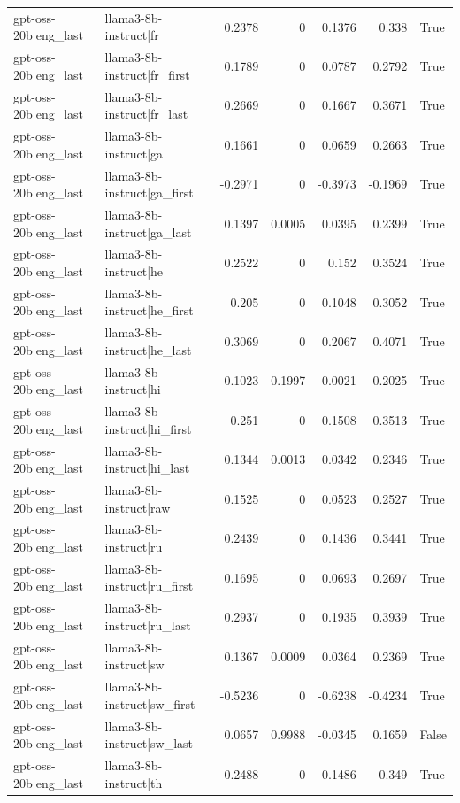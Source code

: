 \begin{table}
\begin{tabular}{l l r r r r l}
gpt-oss-20b|eng_last & llama3-8b-instruct|fr & 0.2378 & 0 & 0.1376 & 0.338 & True \\
gpt-oss-20b|eng_last & llama3-8b-instruct|fr_first & 0.1789 & 0 & 0.0787 & 0.2792 & True \\
gpt-oss-20b|eng_last & llama3-8b-instruct|fr_last & 0.2669 & 0 & 0.1667 & 0.3671 & True \\
gpt-oss-20b|eng_last & llama3-8b-instruct|ga & 0.1661 & 0 & 0.0659 & 0.2663 & True \\
gpt-oss-20b|eng_last & llama3-8b-instruct|ga_first & -0.2971 & 0 & -0.3973 & -0.1969 & True \\
gpt-oss-20b|eng_last & llama3-8b-instruct|ga_last & 0.1397 & 0.0005 & 0.0395 & 0.2399 & True \\
gpt-oss-20b|eng_last & llama3-8b-instruct|he & 0.2522 & 0 & 0.152 & 0.3524 & True \\
gpt-oss-20b|eng_last & llama3-8b-instruct|he_first & 0.205 & 0 & 0.1048 & 0.3052 & True \\
gpt-oss-20b|eng_last & llama3-8b-instruct|he_last & 0.3069 & 0 & 0.2067 & 0.4071 & True \\
gpt-oss-20b|eng_last & llama3-8b-instruct|hi & 0.1023 & 0.1997 & 0.0021 & 0.2025 & True \\
gpt-oss-20b|eng_last & llama3-8b-instruct|hi_first & 0.251 & 0 & 0.1508 & 0.3513 & True \\
gpt-oss-20b|eng_last & llama3-8b-instruct|hi_last & 0.1344 & 0.0013 & 0.0342 & 0.2346 & True \\
gpt-oss-20b|eng_last & llama3-8b-instruct|raw & 0.1525 & 0 & 0.0523 & 0.2527 & True \\
gpt-oss-20b|eng_last & llama3-8b-instruct|ru & 0.2439 & 0 & 0.1436 & 0.3441 & True \\
gpt-oss-20b|eng_last & llama3-8b-instruct|ru_first & 0.1695 & 0 & 0.0693 & 0.2697 & True \\
gpt-oss-20b|eng_last & llama3-8b-instruct|ru_last & 0.2937 & 0 & 0.1935 & 0.3939 & True \\
gpt-oss-20b|eng_last & llama3-8b-instruct|sw & 0.1367 & 0.0009 & 0.0364 & 0.2369 & True \\
gpt-oss-20b|eng_last & llama3-8b-instruct|sw_first & -0.5236 & 0 & -0.6238 & -0.4234 & True \\
gpt-oss-20b|eng_last & llama3-8b-instruct|sw_last & 0.0657 & 0.9988 & -0.0345 & 0.1659 & False \\
gpt-oss-20b|eng_last & llama3-8b-instruct|th & 0.2488 & 0 & 0.1486 & 0.349 & True \\

\end{tabular}
\end{table}
